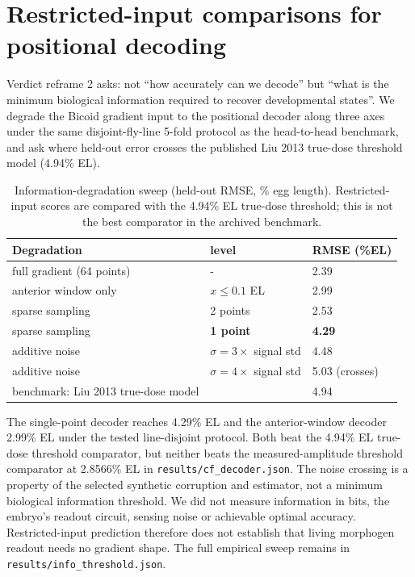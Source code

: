 \section{Restricted-input comparisons for positional decoding}
Verdict reframe 2 asks: not ``how accurately can we decode'' but ``what is the minimum biological information required to recover developmental states''. We degrade the Bicoid gradient input to the positional decoder along three axes under the same disjoint-fly-line 5-fold protocol as the head-to-head benchmark, and ask where held-out error crosses the published Liu 2013 true-dose threshold model (4.94\% EL).
\begin{table}[!htbp]\centering\small
\caption{Information-degradation sweep (held-out RMSE, \% egg length). Restricted-input scores are compared with the 4.94\% EL true-dose threshold; this is not the best comparator in the archived benchmark.}\label{tab:infothresh}
\begin{tabular}{lll}\hline\hline
Degradation & level & RMSE (\%EL) \\ \hline
full gradient (64 points) & - & 2.39 \\
anterior window only & $x \le 0.1$ EL & 2.99 \\
sparse sampling & 2 points & 2.53 \\
sparse sampling & \textbf{1 point} & \textbf{4.29} \\
additive noise & $\sigma = 3\times$ signal std & 4.48 \\
additive noise & $\sigma = 4\times$ signal std & 5.03 (crosses) \\
\hline\hline
benchmark: Liu 2013 true-dose model & & 4.94 \\
\hline\hline\end{tabular}
\end{table}

The single-point decoder reaches 4.29\% EL and the anterior-window decoder 2.99\% EL under the tested line-disjoint protocol. Both beat the 4.94\% EL true-dose threshold comparator, but neither beats the measured-amplitude threshold comparator at 2.8566\% EL in \texttt{results/cf\_decoder.json}. The noise crossing is a property of the selected synthetic corruption and estimator, not a minimum biological information threshold. We did not measure information in bits, the embryo's readout circuit, sensing noise or achievable optimal accuracy. Restricted-input prediction therefore does not establish that living morphogen readout needs no gradient shape. The full empirical sweep remains in \texttt{results/info\_threshold.json}.
